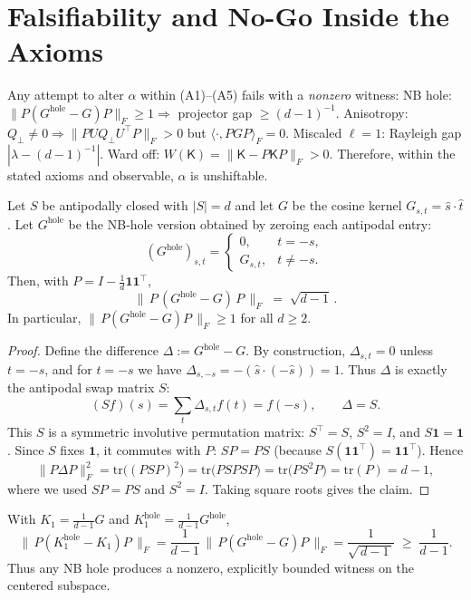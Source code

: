 \section{Falsifiability and No-Go Inside the Axioms}
Any attempt to alter \(\alpha\) within (A1)–(A5) fails with a \emph{nonzero} witness:
NB hole: \(\|P(G^{\mathrm{hole}}-G)P\|_F\ge 1\Rightarrow\) projector gap \(\ge (d-1)^{-1}\).
Anisotropy: \(Q_\perp\neq 0\Rightarrow\|PUQ_\perp U^\top P\|_F>0\) but \(\langle\cdot,PGP\rangle_F=0\).
Miscaled \(\ell=1\): Rayleigh gap \(|\lambda-(d-1)^{-1}|\).
Ward off: \(W(\mathsf{K})=\|\mathsf{K}-P\mathsf{K}P\|_F>0\).
Therefore, within the stated axioms and observable, \(\alpha\) is unshiftable.
\begin{lemma}\label{lem:NBhole-gap}
Let $S$ be antipodally closed with $|S|=d$ and let $G$ be the cosine kernel $G_{s,t}=\hat s\!\cdot\!\hat t$.
Let $G^{\mathrm{hole}}$ be the NB-hole version obtained by zeroing each antipodal entry:
\[
(G^{\mathrm{hole}})_{s,t}=\begin{cases}
0,& t=-s,\\
G_{s,t},& t\neq -s.
\end{cases}
\]
Then, with $P=I-\frac{1}{d}\mathbf{1}\mathbf{1}^\top$,
\[
\bigl\|\,P\,(G^{\mathrm{hole}}-G)\,P\,\bigr\|_F \;=\; \sqrt{d-1}\,.
\]
In particular, $\bigl\|\,P(G^{\mathrm{hole}}-G)P\,\bigr\|_F \ge 1$ for all $d\ge 2$.
\end{lemma}

\begin{proof}
Define the difference $\Delta:=G^{\mathrm{hole}}-G$. By construction, $\Delta_{s,t}=0$ unless $t=-s$, and for $t=-s$ we have
\(
\Delta_{s,-s}=-(\hat s\!\cdot\!(-\hat s))=1.
\)
Thus $\Delta$ is exactly the antipodal swap matrix $S$:
\[
(\!Sf\!)(s)=\sum_{t}\Delta_{s,t}f(t)=f(-s),\qquad \Delta=S.
\]
This $S$ is a symmetric involutive permutation matrix: $S^\top=S$, $S^2=I$, and $S\mathbf{1}=\mathbf{1}$. Since $S$ fixes $\mathbf{1}$, it commutes with $P$:
\(
SP=PS
\)
(because $S(\mathbf{1}\mathbf{1}^\top)=\mathbf{1}\mathbf{1}^\top$).
Hence
\[
\|P\Delta P\|_F^2=\mathrm{tr}\!\bigl((P S P)^2\bigr)
=\mathrm{tr}\!\bigl(P S P S P\bigr)
=\mathrm{tr}\!\bigl(P S^2 P\bigr)
=\mathrm{tr}(P)=d-1,
\]
where we used $SP=PS$ and $S^2=I$. Taking square roots gives the claim.
\end{proof}

\begin{corollary}\label{cor:scaled-gap}
With $K_1=\frac{1}{d-1}G$ and $K_1^{\mathrm{hole}}=\frac{1}{d-1}G^{\mathrm{hole}}$,
\[
\bigl\|\,P(K_1^{\mathrm{hole}}-K_1)P\,\bigr\|_F
=\frac{1}{d-1}\,\bigl\|\,P(G^{\mathrm{hole}}-G)P\,\bigr\|_F
=\frac{1}{\sqrt{\,d-1\,}}
\;\ge\;\frac{1}{d-1}.
\]
Thus any NB hole produces a nonzero, explicitly bounded witness on the centered subspace.
\end{corollary}



